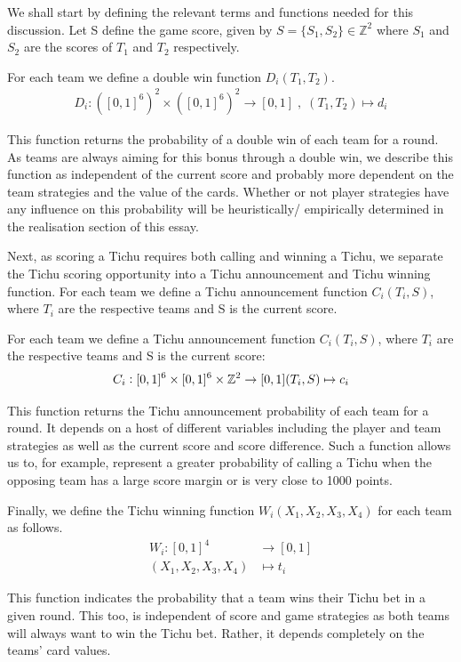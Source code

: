 We shall start by defining the relevant terms and functions needed for this discussion. Let S define the game score, given by $S = \{S_1, S_2\} \in \mathbb{Z}^2$ where $S_1$ and $S_2$ are the scores of $T_1$ and $T_2$ respectively.

\begin{definition}
For each team we define a double win function $D_i(T_1, T_2)$.
\begin{align*}
D_i: ([0,1]^6)^2\times([0,1]^6)^2 \to [0,1]\; ,\;(T_1,T_2) \mapsto d_i
\end{align*}
\end{definition}
This function returns the probability of a double win of each team for a round. As teams are always aiming for this bonus through a double win, we describe this function as independent of the current score and probably more dependent on the team strategies and the value of the cards. Whether or not player strategies have any influence on this probability will be heuristically/ empirically determined in the realisation section of this essay.

Next, as scoring a Tichu requires both calling and winning a Tichu, we separate the Tichu scoring opportunity into a Tichu announcement and Tichu winning function. For each team we define a Tichu announcement function $C_i(T_i, S)$, where $T_i$ are the respective teams and S is the current score. 


\begin{definition}
For each team we define a Tichu announcement function $C_i(T_i, S)$, where $T_i$ are the respective teams and S is the current score:
\begin{align*}
C_i: [0,1]^6 \times [0,1]^6 \times \mathbb{Z}^2 \to [0,1] (T_i,S) \mapsto c_i
\end{align*}
\end{definition}
This function returns the Tichu announcement probability of each team for a round. It depends on a host of different variables including the player and team strategies as well as the current score and score difference. Such a function allows us to, for example, represent a greater probability of calling a Tichu when the opposing team has a large score margin or is very close to 1000 points.


\begin{definition}
Finally, we define the Tichu winning function $W_i(X_1, X_2,X_3,X_4)$ for each team as follows.
\begin{align*}
W_i: [0,1]^4 &\to [0,1] \\(X_1,X_2,X_3,X_4) &\mapsto t_i
\end{align*}
\end{definition}
This function indicates the probability that a team wins their Tichu bet in a given round. This too, is independent of score and game strategies as both teams will always want to win the Tichu bet. Rather, it depends completely on the teams’ card values.


